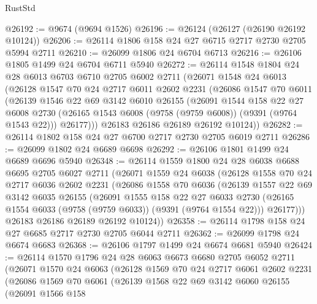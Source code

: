 \begin{lexlean}{RustStd}
\begin{coremodule}
@26192 := @9674 (@9694 @1526)
@26196 := @26124 (@26127 (@26190 @26192 @10124))
@26206 := @26114 @1806 @158 @24 @27 @6715 @2717 @2730 @2705 @5994 @2711
@26210 := @26099 @1806 @24 @6704 @6713
@26216 := @26106 @1805 @1499 @24 @6704 @6711 @5940
@26272 := @26114
    @1548
    @1804
    @24
    @28
    @6013
    @6703
    @6710
    @2705
    @6002
    @2711
    (@26071
      @1548
      @24
      @6013
      (@26128
        @1547
        @70
        @24
        @2717
        @6011
        @2602
        @2231
        (@26086
          @1547
          @70
          @6011
          (@26139
            @1546
            @22
            @69
            @3142
            @6010
            @26155
            (@26091
              @1544
              @158
              @22
              @27
              @6008
              @2730
              (@26165 @1543 @6008 (@9758 (@9759 @6008)) (@9391 (@9764 @1543 @22)))
              @26177)))
        @26183
        @26186
        @26189
        @26192
        @10124))
@26282 := @26114 @1802 @158 @24 @27 @6700 @2717 @2730 @2705 @6019 @2711
@26286 := @26099 @1802 @24 @6689 @6698
@26292 := @26106 @1801 @1499 @24 @6689 @6696 @5940
@26348 := @26114
    @1559
    @1800
    @24
    @28
    @6038
    @6688
    @6695
    @2705
    @6027
    @2711
    (@26071
      @1559
      @24
      @6038
      (@26128
        @1558
        @70
        @24
        @2717
        @6036
        @2602
        @2231
        (@26086
          @1558
          @70
          @6036
          (@26139
            @1557
            @22
            @69
            @3142
            @6035
            @26155
            (@26091
              @1555
              @158
              @22
              @27
              @6033
              @2730
              (@26165 @1554 @6033 (@9758 (@9759 @6033)) (@9391 (@9764 @1554 @22)))
              @26177)))
        @26183
        @26186
        @26189
        @26192
        @10124))
@26358 := @26114 @1798 @158 @24 @27 @6685 @2717 @2730 @2705 @6044 @2711
@26362 := @26099 @1798 @24 @6674 @6683
@26368 := @26106 @1797 @1499 @24 @6674 @6681 @5940
@26424 := @26114
    @1570
    @1796
    @24
    @28
    @6063
    @6673
    @6680
    @2705
    @6052
    @2711
    (@26071
      @1570
      @24
      @6063
      (@26128
        @1569
        @70
        @24
        @2717
        @6061
        @2602
        @2231
        (@26086
          @1569
          @70
          @6061
          (@26139
            @1568
            @22
            @69
            @3142
            @6060
            @26155
            (@26091
              @1566
              @158

\end{coremodule}
\end{lexlean}
